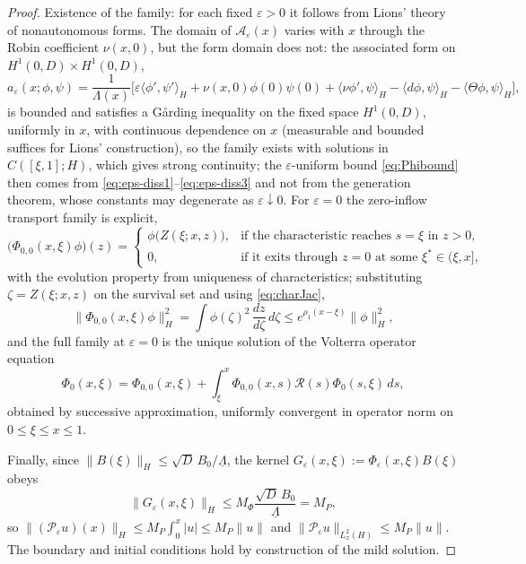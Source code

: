 \documentclass[12pt]{article}
\theoremstyle{plain}
\theoremstyle{remark}
\newcommand{\uL}{\underline\Lambda}
\newcommand{\PP}{\mathcal P}
\newcommand{\Hs}{H}
\begin{document}
\begin{proof}
Existence of the family: for each fixed $\varepsilon>0$ it follows from Lions' theory of nonautonomous forms. The domain of $\mathcal A_\varepsilon(x)$ varies with $x$ through the Robin coefficient $\nu(x,0)$, but the form domain does not: the associated form on $H^1(0,D)\times H^1(0,D)$,
\begin{equation}
 a_\varepsilon(x;\phi,\psi)
 =\frac{1}{\Lambda(x)}
 \Big[\varepsilon\langle\phi',\psi'\rangle_\Hs
 +\nu(x,0)\phi(0)\psi(0)
 +\langle\nu\phi',\psi\rangle_\Hs
 -\langle d\phi,\psi\rangle_\Hs
 -\langle\Theta\phi,\psi\rangle_\Hs\Big],
 \label{eq:form}
\end{equation}
is bounded and satisfies a G\aa rding inequality on the fixed space $H^1(0,D)$, uniformly in $x$, with continuous dependence on $x$ (measurable and bounded suffices for Lions' construction), so the family exists with solutions in $C([\xi,1];\Hs)$, which gives strong continuity; the $\varepsilon$-uniform bound \eqref{eq:Phibound} then comes from \eqref{eq:eps-diss1}--\eqref{eq:eps-diss3} and not from the generation theorem, whose constants may degenerate as $\varepsilon\downarrow0$. For $\varepsilon=0$ the zero-inflow transport family is explicit,
\begin{equation}
 \big(\Phi_{0,0}(x,\xi)\phi\big)(z)
 =\begin{cases}
 \phi\big(Z(\xi;x,z)\big), & \text{if the characteristic reaches }s=\xi\text{ in }z>0,\\
 0, & \text{if it exits through }z=0\text{ at some }\xi^*\in(\xi,x],
 \end{cases}
 \label{eq:Phi0def}
\end{equation}
with the evolution property from uniqueness of characteristics; substituting $\zeta=Z(\xi;x,z)$ on the survival set and using \eqref{eq:charJac},
\begin{equation}
 \|\Phi_{0,0}(x,\xi)\phi\|_\Hs^2
 =\int\phi(\zeta)^2\,\frac{dz}{d\zeta}\,d\zeta
 \le e^{\rho_1(x-\xi)}\|\phi\|_\Hs^2,
 \label{eq:Phi0bound}
\end{equation}
and the full family at $\varepsilon=0$ is the unique solution of the Volterra operator equation
\begin{equation}
 \Phi_0(x,\xi)=\Phi_{0,0}(x,\xi)+\int_\xi^x\Phi_{0,0}(x,s)\mathcal R(s)\Phi_0(s,\xi)\,ds,
 \label{eq:PhiDuhamel}
\end{equation}
obtained by successive approximation, uniformly convergent in operator norm on $0\le\xi\le x\le1$.

Finally, since $\|B(\xi)\|_\Hs\le\sqrt D\,B_0/\uL$, the kernel $G_\varepsilon(x,\xi):=\Phi_\varepsilon(x,\xi)B(\xi)$ obeys
\begin{equation}
 \|G_\varepsilon(x,\xi)\|_\Hs\le M_\Phi\frac{\sqrt D\,B_0}{\uL}=M_P,
 \label{eq:MG}
\end{equation}
so $\|(\PP_\varepsilon u)(x)\|_\Hs\le M_P\int_0^x|u|\le M_P\|u\|$ and $\|\PP_\varepsilon u\|_{L^2_x(\Hs)}\le M_P\|u\|$. The boundary and initial conditions hold by construction of the mild solution.


\end{proof}
\end{document}
